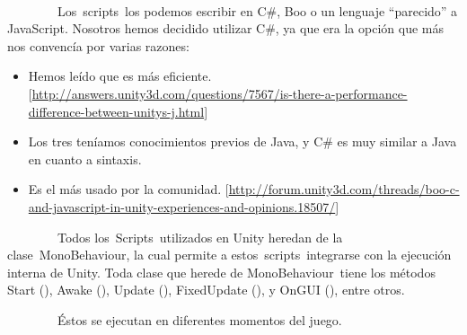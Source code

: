 \paragraph{}\label{h.sl0g53rzcit}


~~~~~~~~Los~scripts~los podemos escribir en C\#, Boo o un lenguaje
``parecido'' a JavaScript. Nosotros hemos decidido utilizar C\#, ya que
era la opción que más nos convencía por varias razones:

\begin{itemize}
\itemsep1pt\parskip0pt
\item
  Hemos leído que es más eficiente.
  {[}\href{https://www.google.com/url?q=http://answers.unity3d.com/questions/7567/is-there-a-performance-difference-between-unitys-j.html\&sa=D\&ust=1464634042320000\&usg=AFQjCNElUd6YFcsJJ9k7ZvzxqyA4HdoAKg}{http://answers.unity3d.com/questions/7567/is-there-a-performance-difference-between-unitys-j.html}{]}
\item
  Los tres teníamos conocimientos previos de Java, y C\# es muy similar
  a Java en cuanto a sintaxis.
\item
  Es el más usado por la comunidad.
  {[}\href{https://www.google.com/url?q=http://forum.unity3d.com/threads/boo-c-and-javascript-in-unity-experiences-and-opinions.18507/\&sa=D\&ust=1464634042321000\&usg=AFQjCNGiTcG4FXN6wxE7m2bMy44Ah01J-Q}{http://forum.unity3d.com/threads/boo-c-and-javascript-in-unity-experiences-and-opinions.18507/}{]}
\end{itemize}

~~~~~~~~Todos los~Scripts~utilizados en Unity heredan de la
clase~MonoBehaviour, la cual permite a estos~scripts~integrarse con la
ejecución interna de Unity. Toda clase que herede de MonoBehaviour~tiene
los métodos Start (), Awake (), Update (), FixedUpdate (), y OnGUI (),
entre otros.

~~~~~~~~Éstos se ejecutan en diferentes momentos del juego.

